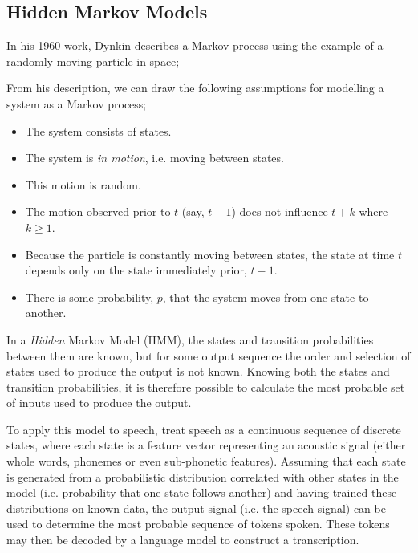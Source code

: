 \subsection{Hidden Markov Models}

In his 1960 work\cite{dynkin1960}, Dynkin describes a Markov process using the example of a randomly-moving particle in space;


From his description, we can draw the following assumptions for modelling a system as a Markov process;

\begin{itemize}
  \item The system consists of states.
  \item The system is \emph{in motion}, i.e. moving between states.
  \item This motion is random.
  \item The motion observed prior to $t$ (say, $t-1$) does not influence $t+k$ where $k \geq 1$.
  \item Because the particle is constantly moving between states, the state at time $t$ depends only on the state immediately prior, $t-1$.
  \item There is some probability, $p$, that the system moves from one state to another.
\end{itemize}

In a \emph{Hidden} Markov Model (HMM), the states and transition probabilities between them are known, but for some output sequence the order and selection of states used to produce the output is not known.
Knowing both the states and transition probabilities, it is therefore possible to calculate the most probable set of inputs used to produce the output.

To apply this model to speech, treat speech as a continuous sequence of discrete states, where each state is a feature vector representing an acoustic signal (either whole words, phonemes or even sub-phonetic features\cite{bengio1999markovian}).
Assuming that each state is generated from a probabilistic distribution correlated with other states in the model\cite{Rabiner1989Feb} (i.e. probability that one state follows another) and having trained these distributions on known data, the output signal (i.e. the speech signal) can be used to determine the most probable sequence of tokens spoken.
These tokens may then be decoded by a language model to construct a transcription\cite{bengio1999markovian}.

